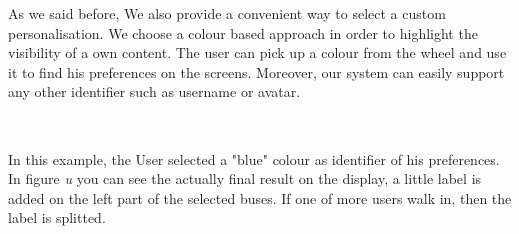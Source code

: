 \documentclass[]{usiinfbachelorproject}
\begin{document}
As we said before, We also provide a convenient way to select a custom personalisation. We choose a colour based approach in order to highlight the visibility of a own content. The user can pick up a colour from the wheel and use it to find his preferences on the screens. Moreover, our system can easily support any other identifier such as username or avatar.
\begin{figure}[H]
  \centering
   \
  \
  \
     \
  \
  \
\end{figure}
In this example, the User selected a "blue" colour as identifier of his preferences. In figure \emph{u} you can see the actually final result on the display, a little label is added on the left part of the selected buses. If one of more users walk in, then the label is splitted.
\begin{figure}[H]
  \centering
\end{figure}
\end{document}
